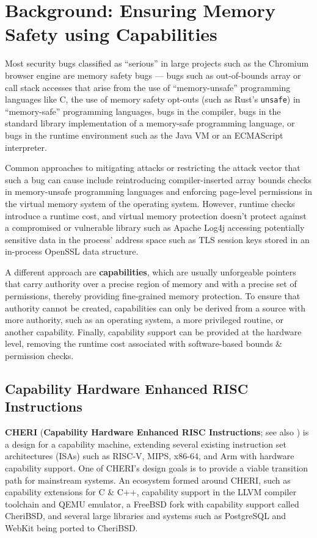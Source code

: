 \documentclass[main.tex]{subfiles}
\begin{document}
\onlyinsubfile{\mainmatter{}}

\chapter{Background: Ensuring Memory Safety using Capabilities}
Most security bugs classified as \enquote{serious} in large projects such as the Chromium browser engine \cite{chromium} are memory safety bugs — bugs such as out-of-bounds array or call stack accesses that arise from the use of \enquote{memory-unsafe} programming languages like C, the use of memory safety opt-outs (such as Rust’s \texttt{unsafe}) in \enquote{memory-safe} programming languages, bugs in the compiler, bugs in the standard library implementation of a memory-safe programming language, or bugs in the runtime environment such as the Java VM or an ECMAScript interpreter.

Common approaches to mitigating attacks or restricting the attack vector that such a bug can cause include reintroducing compiler-inserted array bounds checks in memory-unsafe programming languages and enforcing page-level permissions in the virtual memory system of the operating system. However, runtime checks introduce a runtime cost, and virtual memory protection doesn’t protect against a compromised or vulnerable library such as Apache Log4j accessing potentially sensitive data in the process’ address space such as TLS session keys stored in an in-process OpenSSL data structure.

A different approach are \textbf{capabilities}, which are usually unforgeable pointers that carry authority over a precise region of memory and with a precise set of permissions, thereby providing fine-grained memory protection. To ensure that authority cannot be created, capabilities can only be derived from a source with more authority, such as an operating system, a more privileged routine, or another capability. Finally, capability support can be provided at the hardware level, removing the runtime cost associated with software-based bounds \& permission checks.

\section{Capability Hardware Enhanced RISC Instructions}
\textbf{CHERI} (\textbf{Capability Hardware Enhanced RISC Instructions}; see also \cite{intro2cheri}) is a design for a capability machine, extending several existing instruction set architectures (ISAs) such as RISC-V, MIPS, x86-64, and Arm with hardware capability support. One of CHERI’s design goals is to provide a viable transition path for mainstream systems. An ecosystem formed around CHERI, such as capability extensions for C \& C++, capability support in the LLVM compiler toolchain and QEMU emulator, a FreeBSD fork with capability support called CheriBSD, and several large libraries and systems such as PostgreSQL and WebKit being ported to CheriBSD.
\end{document}

